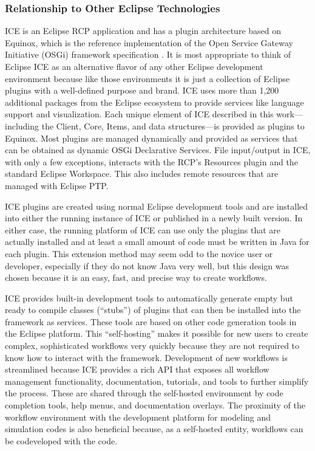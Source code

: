 \subsubsection{Relationship to Other Eclipse Technologies}\label{framework}

ICE is an Eclipse RCP application \cite{mcaffer_eclipse_2010} and has a plugin
architecture based on Equinox, which is the reference implementation of the Open
Service Gateway Initiative (OSGi) framework specification
\cite{mcaffer_osgi_2010}. It is most appropriate to think of Eclipse ICE as an
alternative flavor of any other Eclipse development environment because like
those environments it is just a collection of Eclipse plugins with a
well-defined purpose and brand. ICE uses more than 1,200 additional packages
from the Eclipse ecosystem to provide services like language support and
visualization. Each unique element of ICE described in this work---including the
Client, Core, Items, and data structures---is provided as plugins to Equinox.
Most plugins are managed dynamically and provided as services that can be
obtained as dynamic OSGi Declarative Services. File input/output in ICE, with
only a few exceptions, interacts with the RCP's Resources plugin and the
standard Eclipse Workspace. This also includes remote resources that are
managed with Eclipse PTP.

ICE plugins are created using normal Eclipse development tools and are installed
into either the running instance of ICE or published in a newly built version.
In either case, the running platform of ICE can use only the plugins that are
actually installed and at least a small amount of code must be written in Java
for each plugin. This extension method may seem odd to the novice user or
developer, especially if they do not know Java very well, but this design was
chosen because it is an easy, fast, and precise way to create workflows.

ICE provides built-in development tools to automatically generate empty but
ready to compile classes (``stubs'') of plugins that can then be installed into
the framework as services. These tools are based on other code generation tools
in the Eclipse platform. This ``self-hosting'' makes it possible for new users
to create complex, sophisticated workflows very quickly because they are not
required to know how to interact with the framework. Development of new
workflows is streamlined because ICE provides a rich API that exposes all
workflow management functionality, documentation, tutorials, and tools to
further simplify the process. These are shared through the self-hosted
environment by code completion tools, help menus, and documentation overlays.
The proximity of the workflow environment with the development platform
for modeling and simulation codes is also beneficial because, as a self-hosted
entity, workflows can be codeveloped with the code.

